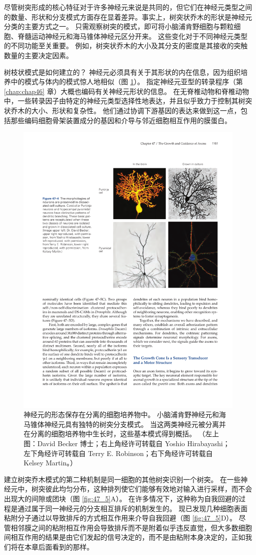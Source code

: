尽管树突形成的核心特征对于许多神经元来说是共同的，但它们在神经元类型之间的数量、形状和分支模式方面存在显着差异。事实上，树突状乔木的形状是神经元分类的主要方式之一。
只需观察树突的模式，即可将小脑浦肯野细胞与颗粒细胞、脊髓运动神经元和海马锥体神经元区分开来。
这些变化对于不同神经元类型的不同功能至关重要。
例如，树突状乔木的大小及其分支的密度是其接收的突触数量的主要决定因素。


树枝状模式是如何建立的？
神经元必须具有关于其形状的内在信息，因为组织培养中的模式与体内的模式惊人地相似（图 \ref{fig:47_4}）。
指定神经元亚型的转录程序（第 \ref{chap:chap46} 章）大概也编码有关神经元形状的信息。
在无脊椎动物和脊椎动物中，一些转录因子由特定的神经元类型选择性地表达，并且似乎致力于控制其树突状乔木的大小、形状和复杂性。
他们通过协调下游基因的表达来做到这一点，包括那些编码细胞骨架装置成分的基因和介导与邻近细胞相互作用的膜蛋白。


\begin{figure}[htbp]
	\centering
	\includegraphics[width=0.7\linewidth]{chap47/fig_47_4}
	\caption{神经元的形态保存在分离的细胞培养物中。 小脑浦肯野神经元和海马锥体神经元具有独特的树突分支模式。 当这两类神经元被分离并在分离的细胞培养物中生长时，这些基本模式得到概括。 （左上图：David Becker 博士；右上角经许可转载自 Yoshio Hirabayashi；左下角经许可转载自 Terry E. Robinson；右下角经许可转载自 Kelsey Martin。）}
	\label{fig:47_4}
\end{figure}

建立树突乔木模式的第二种机制是同一细胞的其他树突识别一个树突。
在一些神经元中，树突彼此均匀分布，这种排列使它们能够有效地对输入进行采样，而不会出现大的间隙或团块（图 \ref{fig:47_5}A）。
在许多情况下，这种称为自我回避的过程是通过属于同一神经元的分支相互排斥的机制发生的。
现已发现几种细胞表面粘附分子通过以导致排斥的方式相互作用来介导自我回避（图 \ref{fig:47_5}D）。
尽管相邻膜之间的粘附相互作用会导致排斥而不是附着似乎违反直觉，但大多数细胞间相互作用的结果是由它们发起的信号决定的，而不是由粘附本身决定的，正如我们将在本章后面看到的那样。


